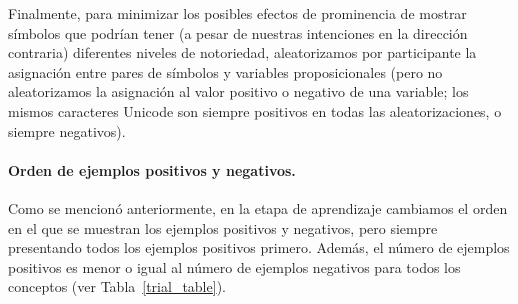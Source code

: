 Finalmente, para minimizar los posibles efectos de prominencia de mostrar símbolos que podrían tener (a pesar de nuestras intenciones en la dirección contraria) diferentes niveles de notoriedad, aleatorizamos por participante la asignación entre pares de símbolos y variables proposicionales (pero no aleatorizamos la asignación al valor positivo o negativo de una variable; los mismos caracteres Unicode son siempre positivos en todas las aleatorizaciones, o siempre negativos).

\paragraph{Orden de ejemplos positivos y negativos.}

Como se mencionó anteriormente, en la etapa de aprendizaje cambiamos el orden en el que se muestran los ejemplos positivos y negativos, pero siempre presentando todos los ejemplos positivos primero. Además, el número de ejemplos positivos es menor o igual al número de ejemplos negativos para todos los conceptos (ver Tabla~\ref{trial_table}).

